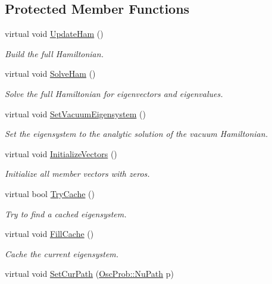 \subsection*{Protected Member Functions}
\begin{DoxyCompactItemize}
\item 
virtual void \hyperlink{classOscProb_1_1PMNS__NSI_ab5c4f4644fbedb8835f6336c553805ce}{Update\+Ham} ()
\begin{DoxyCompactList}\small\item\em Build the full Hamiltonian. \end{DoxyCompactList}\item 
virtual void \hyperlink{classOscProb_1_1PMNS__Fast_a8a0828401591e88c60e0051fbfe02d5e}{Solve\+Ham} ()
\begin{DoxyCompactList}\small\item\em Solve the full Hamiltonian for eigenvectors and eigenvalues. \end{DoxyCompactList}\item 
virtual void \hyperlink{classOscProb_1_1PMNS__Fast_a76dd5a761df8689c502b28ad0391f9e2}{Set\+Vacuum\+Eigensystem} ()
\begin{DoxyCompactList}\small\item\em Set the eigensystem to the analytic solution of the vacuum Hamiltonian. \end{DoxyCompactList}\item 
virtual void \hyperlink{classOscProb_1_1PMNS__Base_adf23b569112f9f9e0e592f01d79a5f3d}{Initialize\+Vectors} ()
\begin{DoxyCompactList}\small\item\em Initialize all member vectors with zeros. \end{DoxyCompactList}\item 
virtual bool \hyperlink{classOscProb_1_1PMNS__Base_abe533da5f64bec1f4724ab7b58606b77}{Try\+Cache} ()
\begin{DoxyCompactList}\small\item\em Try to find a cached eigensystem. \end{DoxyCompactList}\item 
virtual void \hyperlink{classOscProb_1_1PMNS__Base_a785c37fcea974628623c8881bb0fbbf9}{Fill\+Cache} ()
\begin{DoxyCompactList}\small\item\em Cache the current eigensystem. \end{DoxyCompactList}\item 
virtual void \hyperlink{classOscProb_1_1PMNS__Base_a986e6ebef09a7e2eb7fee16a4c2c834d}{Set\+Cur\+Path} (\hyperlink{structOscProb_1_1NuPath}{Osc\+Prob\+::\+Nu\+Path} p)

\end{DoxyCompactItemize}
